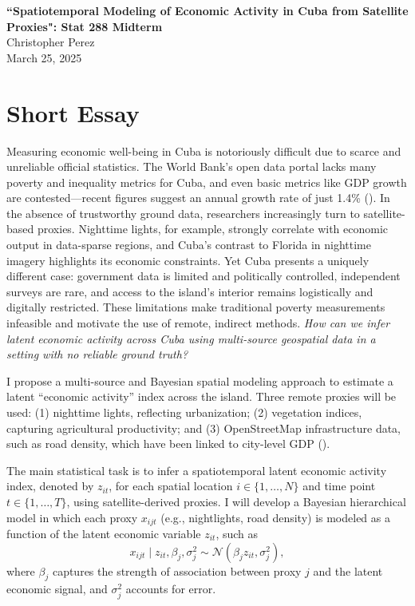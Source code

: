 \documentclass[12pt]{article}
\begin{document}
\begin{center}
    \Large\textbf{``Spatiotemporal Modeling of Economic Activity in Cuba from Satellite Proxies": Stat 288 Midterm} \\
    \normalsize Christopher Perez \\
    \normalsize March 25, 2025 \\
    \vspace{0.5cm}
\end{center}

\section{Short Essay}

Measuring economic well-being in Cuba is notoriously difficult due to scarce and unreliable official statistics. The World Bank's open data portal lacks many poverty and inequality metrics for Cuba, and even basic metrics like GDP growth are contested---recent figures suggest an annual growth rate of just 1.4\% (\cite{worldbankcuba}). In the absence of trustworthy ground data, researchers increasingly turn to satellite-based proxies. Nighttime lights, for example, strongly correlate with economic output in data-sparse regions, and Cuba's contrast to  Florida in nighttime imagery highlights its economic constraints.
Yet Cuba presents a uniquely different case: government data is limited and politically controlled, independent surveys are rare, and access to the island's interior remains logistically and digitally restricted. These limitations make traditional poverty measurements infeasible and motivate the use of remote, indirect methods. \textit{How can we infer latent economic activity across Cuba using multi-source geospatial data in a setting with no reliable ground truth?}

I propose a multi-source and Bayesian spatial modeling approach to estimate a latent ``economic activity'' index across the island. Three remote proxies will be used: (1) nighttime lights, reflecting urbanization; (2) vegetation indices, capturing agricultural productivity; and (3) OpenStreetMap infrastructure data, such as road density, which have been linked to city-level GDP (\cite{liu2020osmroads}).


The main statistical task is to infer a spatiotemporal latent economic activity index, denoted by \( z_{it} \), for each spatial location \( i \in \{1, \ldots, N\} \) and time point \( t \in \{1, \ldots, T\} \), using satellite-derived proxies. I will develop a Bayesian hierarchical model in which each proxy \( x_{ijt} \) (e.g., nightlights, road density) is modeled as a  function of the latent economic variable \( z_{it} \), such as
\[
x_{ijt} \mid z_{it}, \beta_j, \sigma_j^2 \sim \mathcal{N}(\beta_j z_{it}, \sigma_j^2),
\]
where \( \beta_j \) captures the strength of association between proxy \( j \) and the latent economic signal, and \( \sigma_j^2 \) accounts for error.
\end{document}

